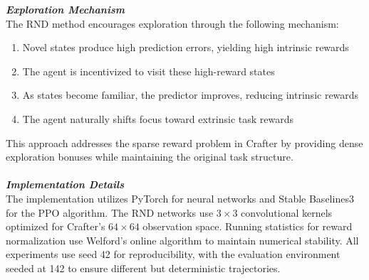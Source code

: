 \documentclass[twocolumn]{article}
\begin{document}
\textbf{\textit{Exploration Mechanism}}\\
The RND method encourages exploration through the following mechanism:
\begin{enumerate}
    \item Novel states produce high prediction errors, yielding high intrinsic rewards
    \item The agent is incentivized to visit these high-reward states
    \item As states become familiar, the predictor improves, reducing intrinsic rewards
    \item The agent naturally shifts focus toward extrinsic task rewards
\end{enumerate}
This approach addresses the sparse reward problem in Crafter by providing dense exploration bonuses while maintaining the original task structure.\\\\
\textbf{\textit{Implementation Details}}\\
The implementation utilizes PyTorch for neural networks and Stable Baselines3 for the PPO algorithm. The RND networks use $3 \times 3$ convolutional kernels optimized for Crafter's $64 \times 64$ observation space. Running statistics for reward normalization use Welford's online algorithm to maintain numerical stability. All experiments use seed 42 for reproducibility, with the evaluation environment seeded at 142 to ensure different but deterministic trajectories.
\end{document}
